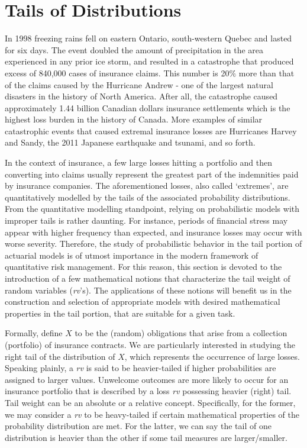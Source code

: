 \documentclass[]{book}
\theoremstyle{definition}
\theoremstyle{definition}
\theoremstyle{definition}
\theoremstyle{remark}
\begin{document}
\section{Tails of Distributions}\label{S:Tails}

In 1998 freezing rains fell on eastern Ontario, south-western Quebec and
lasted for six days. The event doubled the amount of precipitation in
the area experienced in any prior ice storm, and resulted in a
catastrophe that produced excess of 840,000 cases of insurance claims.
This number is 20\(\%\) more than that of the claims caused by the
Hurricane Andrew - one of the largest natural disasters in the history
of North America. After all, the catastrophe caused approximately 1.44
billion Canadian dollars insurance settlements which is the highest loss
burden in the history of Canada. More examples of similar catastrophic
events that caused extremal insurance losses are Hurricanes Harvey and
Sandy, the 2011 Japanese earthquake and tsunami, and so forth.

In the context of insurance, a few large losses hitting a portfolio and
then converting into claims usually represent the greatest part of the
indemnities paid by insurance companies. The aforementioned losses, also
called `extremes', are quantitatively modelled by the tails of the
associated probability distributions. From the quantitative modelling
standpoint, relying on probabilistic models with improper tails is
rather daunting. For instance, periods of financial stress may appear
with higher frequency than expected, and insurance losses may occur with
worse severity. Therefore, the study of probabilistic behavior in the
tail portion of actuarial models is of utmost importance in the modern
framework of quantitative risk management. For this reason, this section
is devoted to the introduction of a few mathematical notions that
characterize the tail weight of random variables (\emph{rv}'s). The
applications of these notions will benefit us in the construction and
selection of appropriate models with desired mathematical properties in
the tail portion, that are suitable for a given task.

Formally, define \(X\) to be the (random) obligations that arise from a
collection (portfolio) of insurance contracts. We are particularly
interested in studying the right tail of the distribution of \(X\),
which represents the occurrence of large losses. Speaking plainly, a
\emph{rv} is said to be heavier-tailed if higher probabilities are
assigned to larger values. Unwelcome outcomes are more likely to occur
for an insurance portfolio that is described by a loss \emph{rv}
possessing heavier (right) tail. Tail weight can be an absolute or a
relative concept. Specifically, for the former, we may consider a
\emph{rv} to be heavy-tailed if certain mathematical properties of the
probability distribution are met. For the latter, we can say the tail of
one distribution is heavier than the other if some tail measures are
larger/smaller.
\end{document}
